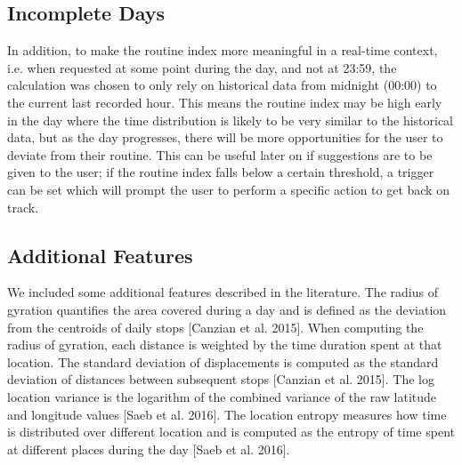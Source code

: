 \subsection{Incomplete Days}
In addition, to make the routine index more meaningful in a real-time context, i.e. when requested at some point during the day, and not at 23:59, the calculation was chosen to only rely on historical data from midnight (00:00) to the current last recorded hour. This means the routine index may be high early in the day where the time distribution is likely to be very similar to the historical data, but as the day progresses, there will be more opportunities for the user to deviate from their routine. This can be useful later on if suggestions are to be given to the user; if the routine index falls below a certain threshold, a trigger can be set which will prompt the user to perform a specific action to get back on track.


\subsection{Additional Features}
We included some additional features described in the literature. The radius of gyration quantifies the area covered during a day and is defined as the deviation from the centroids of daily stops [Canzian et al. 2015]. When computing the radius of gyration, each distance is weighted by the time duration spent at that location. The standard deviation of displacements is computed as the standard deviation of distances between subsequent stops [Canzian et al. 2015]. The log location variance is the logarithm of the combined variance of the raw latitude and longitude values [Saeb et al. 2016]. The location entropy measures how time is distributed over different location and is computed as the entropy of time spent at different places during the day [Saeb et al. 2016].

